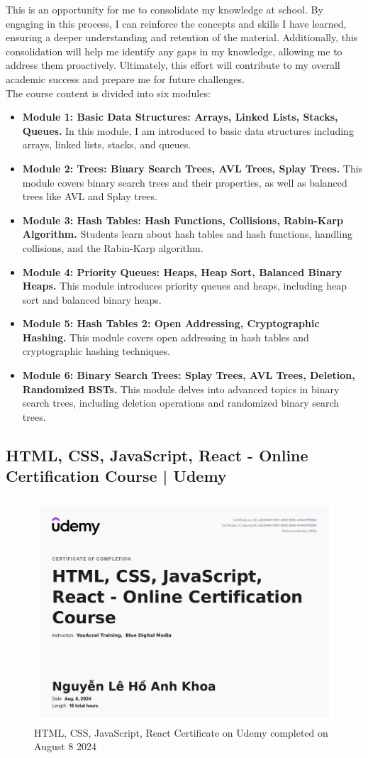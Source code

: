 This is an opportunity for me to consolidate my knowledge at school. By engaging in this process, I can reinforce the concepts and skills I have learned, ensuring a deeper understanding and retention of the material. Additionally, this consolidation will help me identify any gaps in my knowledge, allowing me to address them proactively. Ultimately, this effort will contribute to my overall academic success and prepare me for future challenges. \\

The course content is divided into six modules:
\begin{itemize}
	\item \textbf{Module 1: Basic Data Structures: Arrays, Linked Lists, Stacks, Queues.} In this module, I am introduced to basic data structures including arrays, linked lists, stacks, and queues.
	\item \textbf{Module 2: Trees: Binary Search Trees, AVL Trees, Splay Trees.} This module covers binary search trees and their properties, as well as balanced trees like AVL and Splay trees.
	\item \textbf{Module 3: Hash Tables: Hash Functions, Collisions, Rabin-Karp Algorithm.} Students learn about hash tables and hash functions, handling collisions, and the Rabin-Karp algorithm.
	\item \textbf{Module 4: Priority Queues: Heaps, Heap Sort, Balanced Binary Heaps.} This module introduces priority queues and heaps, including heap sort and balanced binary heaps.
	\item \textbf{Module 5: Hash Tables 2: Open Addressing, Cryptographic Hashing.} This module covers open addressing in hash tables and cryptographic hashing techniques.
	\item \textbf{Module 6: Binary Search Trees: Splay Trees, AVL Trees, Deletion, Randomized BSTs.} This module delves into advanced topics in binary search trees, including deletion operations and randomized binary search trees.
\end{itemize}


\subsection{HTML, CSS, JavaScript, React - Online Certification Course | Udemy}
\begin{figure}[H]
	\centering
	\includegraphics[width=0.7\linewidth]{img/Cert03.png}
	\caption{HTML, CSS, JavaScript, React Certificate on Udemy completed on August 8 2024}
	\label{fig:htmlcssjsreact}
\end{figure}

